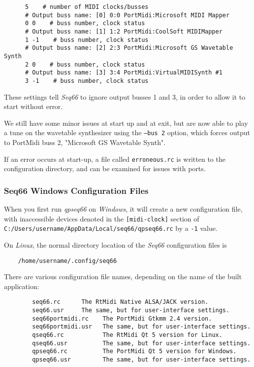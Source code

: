 \begin{verbatim}
      5    # number of MIDI clocks/busses
      # Output buss name: [0] 0:0 PortMidi:Microsoft MIDI Mapper
      0 0    # buss number, clock status
      # Output buss name: [1] 1:2 PortMidi:CoolSoft MIDIMapper
      1 -1    # buss number, clock status
      # Output buss name: [2] 2:3 PortMidi:Microsoft GS Wavetable Synth
      2 0    # buss number, clock status
      # Output buss name: [3] 3:4 PortMidi:VirtualMIDISynth #1
      3 -1    # buss number, clock status
\end{verbatim}

   These settings tell \textsl{Seq66} to ignore output busses 1 and 3,
   in order to allow it to start without error.

    We still have some minor issues at start up and at exit, but are now able
    to play a tune on the wavetable synthesizer using the
    \texttt{--bus 2} option, which forces output to PortMidi buss 2,
    "Microsoft GS Wavetable Synth".

    If an error occurs at start-up, a file called \texttt{erroneous.rc} is
    written to the configuration directory, and can be examined for issues with
    ports.

\subsubsection{Seq66 Windows Configuration Files}
\label{subsubsec:qt_portmidi_windows_setup_config}

    When you first run \textsl{qpseq66}
    on \textsl{Windows}, it will create a new configuration
    file, with inaccessible devices denoted in the
    \texttt{[midi-clock]} section of
    \texttt{C:/Users/username/AppData/Local/seq66/qpseq66.rc}
    by a \texttt{-1} value.

    On \textsl{Linux},
    the normal directory location of the \textsl{Seq66} configuration
    files is

\begin{verbatim}
    /home/username/.config/seq66
\end{verbatim}

   There are various configuration file names, depending on the name of the
   built application:

\begin{verbatim}
        seq66.rc      The RtMidi Native ALSA/JACK version.
        seq66.usr     The same, but for user-interface settings.
        seq66portmidi.rc    The PortMidi Gtkmm 2.4 version.
        seq66portmidi.usr   The same, but for user-interface settings.
        qseq66.rc           The RtMidi Qt 5 version for Linux.
        qseq66.usr          The same, but for user-interface settings.
        qpseq66.rc          The PortMidi Qt 5 version for Windows.
        qpseq66.usr         The same, but for user-interface settings.
\end{verbatim}

